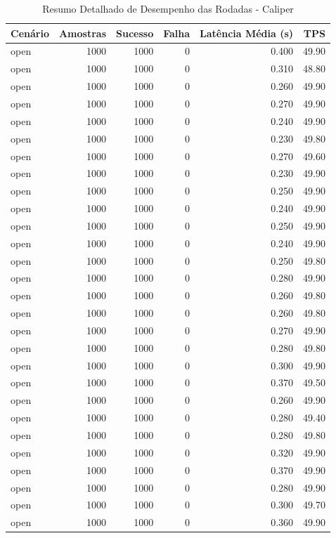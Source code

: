 \begin{table}[ht]
\centering
\caption{Resumo Detalhado de Desempenho das Rodadas - Caliper}
\label{tab:caliper_detailed_rounds}
\begin{tabular}{lrrrrr}
\toprule
Cenário & Amostras & Sucesso & Falha & Latência Média (s) & TPS \\
\midrule
open & 1000 & 1000 & 0 & 0.400 & 49.90 \\
open & 1000 & 1000 & 0 & 0.310 & 48.80 \\
open & 1000 & 1000 & 0 & 0.260 & 49.90 \\
open & 1000 & 1000 & 0 & 0.270 & 49.90 \\
open & 1000 & 1000 & 0 & 0.240 & 49.90 \\
open & 1000 & 1000 & 0 & 0.230 & 49.80 \\
open & 1000 & 1000 & 0 & 0.270 & 49.60 \\
open & 1000 & 1000 & 0 & 0.230 & 49.90 \\
open & 1000 & 1000 & 0 & 0.250 & 49.90 \\
open & 1000 & 1000 & 0 & 0.240 & 49.90 \\
open & 1000 & 1000 & 0 & 0.250 & 49.90 \\
open & 1000 & 1000 & 0 & 0.240 & 49.90 \\
open & 1000 & 1000 & 0 & 0.250 & 49.80 \\
open & 1000 & 1000 & 0 & 0.280 & 49.90 \\
open & 1000 & 1000 & 0 & 0.260 & 49.80 \\
open & 1000 & 1000 & 0 & 0.260 & 49.80 \\
open & 1000 & 1000 & 0 & 0.270 & 49.90 \\
open & 1000 & 1000 & 0 & 0.280 & 49.80 \\
open & 1000 & 1000 & 0 & 0.300 & 49.90 \\
open & 1000 & 1000 & 0 & 0.370 & 49.50 \\
open & 1000 & 1000 & 0 & 0.260 & 49.90 \\
open & 1000 & 1000 & 0 & 0.280 & 49.40 \\
open & 1000 & 1000 & 0 & 0.280 & 49.80 \\
open & 1000 & 1000 & 0 & 0.320 & 49.90 \\
open & 1000 & 1000 & 0 & 0.370 & 49.90 \\
open & 1000 & 1000 & 0 & 0.280 & 49.90 \\
open & 1000 & 1000 & 0 & 0.300 & 49.70 \\
open & 1000 & 1000 & 0 & 0.360 & 49.90 \\

\end{tabular}
\end{table}
